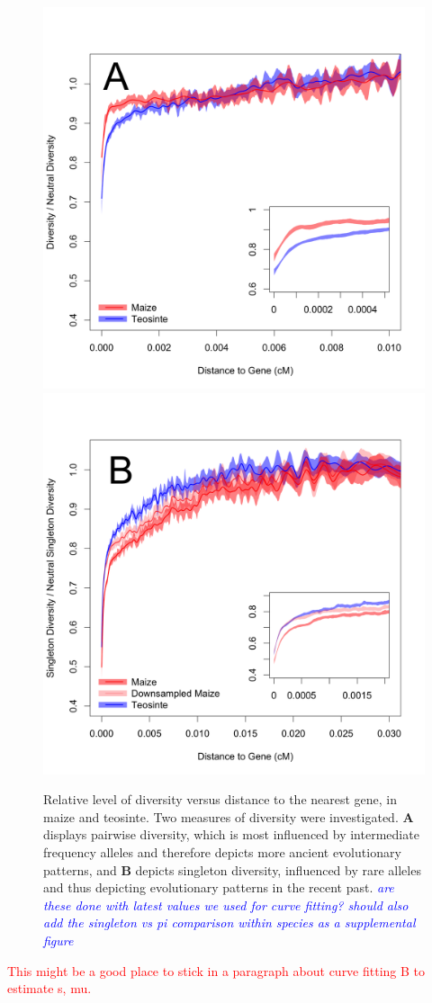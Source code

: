 \documentclass{pnastwo}
\newcommand{\jri}[1]{\textcolor{blue}{\emph{#1}} }
\begin{document}
\begin{article}
\begin{figure}[b]
\centering
\includegraphics[width=.45\textwidth]{FigsAndFiles/distanceToGene_WithSignificance_Folded2_manuscript.png} \includegraphics[width=.45\textwidth]{FigsAndFiles/distanceToGene_WithSignificance_Singletons_Downsampled_threeLines_manuscript.png}
\caption{Relative level of diversity versus distance to the nearest
  gene, in maize and teosinte. Two measures of diversity were
  investigated. \textbf{A} displays pairwise
  diversity, which is most influenced by intermediate frequency
  alleles and therefore depicts more ancient evolutionary patterns,
  and \textbf{B} depicts singleton diversity, influenced by rare
  alleles and thus depicting evolutionary patterns in the recent past. \jri{are these done with latest values we used for curve fitting? should also add the singleton vs pi comparison within species as a supplemental figure}}
\label{purify}
\end{figure}


\textcolor{red}{This might be a good place to stick in a paragraph
  about curve fitting B to estimate s, mu.}



\end{article}
\end{document}
